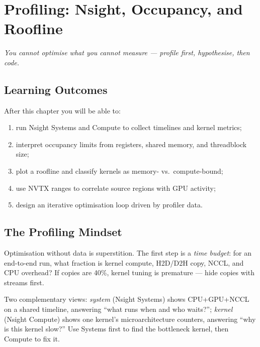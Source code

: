 \chapter{Profiling: Nsight, Occupancy, and Roofline}\label{ch:profiling}

\begin{center}\small\textit{You cannot optimise what you cannot measure --- profile first, hypothesise, then code.}\end{center}

\noindent{}
\vspace{0.4em}

\section*{Learning Outcomes}
After this chapter you will be able to:
\begin{enumerate}[label=(L\arabic*)]
    \item run Nsight Systems and Compute to collect timelines and kernel metrics;
    \item interpret occupancy limits from registers, shared memory, and threadblock size;
    \item plot a roofline and classify kernels as memory- vs.\ compute-bound;
    \item use NVTX ranges to correlate source regions with GPU activity;
    \item design an iterative optimisation loop driven by profiler data.
\end{enumerate}

\section{The Profiling Mindset}
Optimisation without data is superstition. The first step is a \emph{time budget}: for an end-to-end run, what fraction is kernel compute, H2D/D2H copy, NCCL, and CPU overhead? If copies are 40\%, kernel tuning is premature --- hide copies with streams first.

Two complementary views: \emph{system} (Nsight Systems) shows CPU+GPU+NCCL on a shared timeline, answering ``what runs when and who waits?''; \emph{kernel} (Nsight Compute) shows one kernel's microarchitecture counters, answering ``why is this kernel slow?'' Use Systems first to find the bottleneck kernel, then Compute to fix it.

